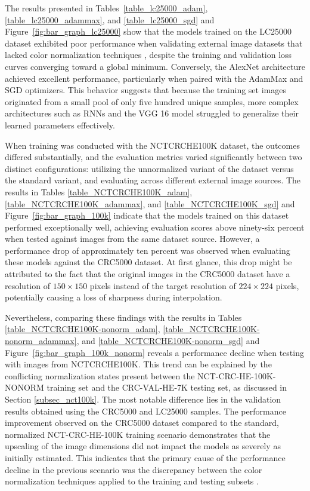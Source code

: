 The results presented in Tables~\ref{table_lc25000_adam}, \ref{table_lc25000_adammax}, and \ref{table_lc25000_sgd} and Figure~\ref{fig:bar_graph_lc25000} show that the models trained on the \gls{LC25000} dataset exhibited poor performance when validating external image datasets that lacked color normalization techniques \cite{5193250}, despite the training and validation loss curves converging toward a global minimum. Conversely, the AlexNet architecture achieved excellent performance, particularly when paired with the AdamMax \cite{DBLP:journals/corr/KingmaB14} and SGD \cite{articleDocReg} optimizers. This behavior suggests that because the training set images originated from a small pool of only five hundred unique samples, more complex architectures such as \glspl{RNN} and the \gls{VGG} 16 model struggled to generalize their learned parameters effectively.

When training was conducted with the \gls{NCTCRCHE100K} dataset, the outcomes differed substantially, and the evaluation metrics varied significantly between two distinct configurations: utilizing the unnormalized variant of the dataset versus the standard variant, and evaluating across different external image sources. The results in Tables \ref{table_NCTCRCHE100K_adam}, \ref{table_NCTCRCHE100K_adammax}, and \ref{table_NCTCRCHE100K_sgd} and Figure~\ref{fig:bar_graph_100k} indicate that the models trained on this dataset performed exceptionally well, achieving evaluation scores above ninety-six percent when tested against images from the same dataset source. However, a performance drop of approximately ten percent was observed when evaluating these models against the \gls{CRC5000} dataset. At first glance, this drop might be attributed to the fact that the original images in the \gls{CRC5000} dataset have a resolution of $150 \times 150$ pixels instead of the target resolution of $224 \times 224$ pixels, potentially causing a loss of sharpness during interpolation.

Nevertheless, comparing these findings with the results in Tables \ref{table_NCTCRCHE100K-nonorm_adam}, \ref{table_NCTCRCHE100K-nonorm_adammax}, and \ref{table_NCTCRCHE100K-nonorm_sgd} and Figure~\ref{fig:bar_graph_100k_nonorm} reveals a performance decline when testing with images from \gls{NCTCRCHE100K}. This trend can be explained by the conflicting normalization states present between the NCT-CRC-HE-100K-NONORM training set and the CRC-VAL-HE-7K testing set, as discussed in Section \ref{subsec_nct100k}. The most notable difference lies in the validation results obtained using the \gls{CRC5000} and \gls{LC25000} samples. The performance improvement observed on the \gls{CRC5000} dataset compared to the standard, normalized NCT-CRC-HE-100K training scenario demonstrates that the upscaling of the image dimensions did not impact the models as severely as initially estimated. This indicates that the primary cause of the performance decline in the previous scenario was the discrepancy between the color normalization techniques applied to the training and testing subsets \cite{5193250}.

